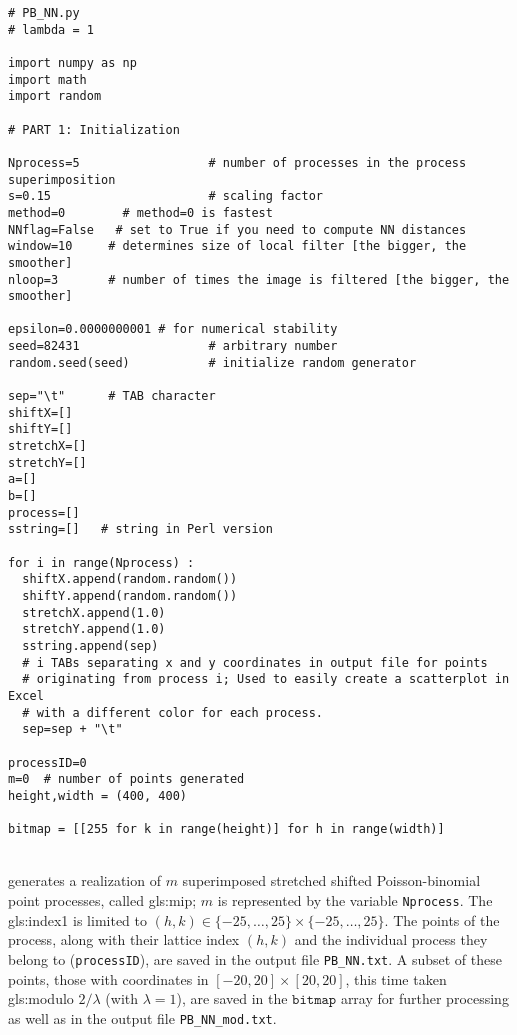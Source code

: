 \documentclass[10pt]{article}
\begin{document}
\begin{lstlisting}
# PB_NN.py
# lambda = 1

import numpy as np
import math
import random

# PART 1: Initialization

Nprocess=5                  # number of processes in the process superimposition
s=0.15                      # scaling factor
method=0        # method=0 is fastest
NNflag=False   # set to True if you need to compute NN distances
window=10     # determines size of local filter [the bigger, the smoother]
nloop=3       # number of times the image is filtered [the bigger, the smoother]

epsilon=0.0000000001 # for numerical stability
seed=82431                  # arbitrary number
random.seed(seed)           # initialize random generator

sep="\t"      # TAB character
shiftX=[]
shiftY=[]
stretchX=[]
stretchY=[]
a=[]
b=[]
process=[]
sstring=[]   # string in Perl version

for i in range(Nprocess) :
  shiftX.append(random.random())
  shiftY.append(random.random())
  stretchX.append(1.0)
  stretchY.append(1.0)
  sstring.append(sep)
  # i TABs separating x and y coordinates in output file for points
  # originating from process i; Used to easily create a scatterplot in Excel
  # with a different color for each process.
  sep=sep + "\t"

processID=0
m=0  # number of points generated
height,width = (400, 400)

bitmap = [[255 for k in range(height)] for h in range(width)]
\end{lstlisting}
\quad \\
 generates a realization of $m$ superimposed stretched shifted Poisson-binomial point processes, called \gls{gls:mip};
$m$ is represented by the variable \texttt{Nprocess}.
The \gls{gls:index1} is limited to $(h,k)\in \{-25,\dots,25\} \times \{-25,\dots,25\}$. The points of the process,
along with their \textcolor{index}{lattice index} $(h,k)$ and the individual process they belong to (\texttt{processID}),
are saved in the output file \texttt{PB\_NN.txt}. A subset of these points, those with coordinates in
$[-20,20]\times [20,20]$, this time taken \gls{gls:modulo} $2/\lambda$ (with $\lambda=1$), are saved in the
$\texttt{bitmap}$ array for further processing as well as in the output file \texttt{PB\_NN\_mod.txt}.
\end{document}
